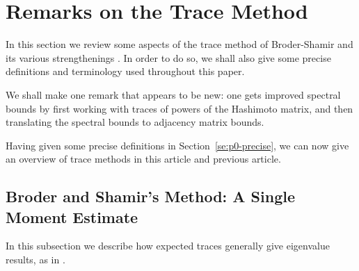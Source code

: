 \documentclass{memo-l}
\theoremstyle{plain}
\theoremstyle{definition}
\numberwithin{section}{chapter}
\numberwithin{equation}{chapter}
\theoremstyle{plain}
\theoremstyle{definition}
\begin{document}
\section{Remarks on the Trace Method}
\label{se:p0-trace}

In this section we review some aspects of the trace method 
of Broder-Shamir \cite{broder} and its various strengthenings
\cite{friedman_random_graphs,friedman_relative,linial_puder,
friedman_alon,puder}.
In order to do so, 
we shall also give some precise definitions and terminology
used throughout this paper.

We shall make one remark that appears to be new: one gets improved
spectral bounds by first working with traces of powers of 
the Hashimoto matrix,
and then translating the spectral bounds to adjacency matrix bounds.

Having given some precise definitions in Section~\ref{se:p0-precise},
we can now give an overview of trace methods in this article
and previous article.



\subsection{Broder and Shamir's Method: A Single Moment Estimate}

In this subsection we describe how expected traces generally give 
eigenvalue results, as in \cite{broder,friedman_random_graphs,
friedman_relative,linial_puder,puder}.
\end{document}
